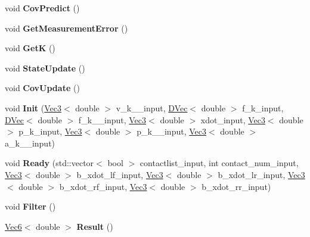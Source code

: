 \begin{DoxyCompactItemize}
\mbox{\label{classKalmanFilterForVE_aac4cbc05791d48ce4db5c0792543b6ca}} 
void {\bfseries Cov\+Predict} ()
\item 
\mbox{\label{classKalmanFilterForVE_aeba0220a16a77d7242fd46fdac46a12c}} 
void {\bfseries Get\+Measurement\+Error} ()
\item 
\mbox{\label{classKalmanFilterForVE_ab5f0573c67c441e4ab6601bc5b39a847}} 
void {\bfseries GetK} ()
\item 
\mbox{\label{classKalmanFilterForVE_ae0236f9ddaf1b50238629b625c12a710}} 
void {\bfseries State\+Update} ()
\item 
\mbox{\label{classKalmanFilterForVE_a4ac37ed6256c1a50a466dbd7e77001b1}} 
void {\bfseries Cov\+Update} ()
\item 
\mbox{\label{classKalmanFilterForVE_a22c13294c1e43ed52ff9a48ee1398243}} 
void {\bfseries Init} (\hyperlink{cppTypes_8h_a65c27bf97693676535dd0b30ea0ad399}{Vec3}$<$ double $>$ v\+\_\+k\+\_\+\_\+input, \hyperlink{cppTypes_8h_adad69baca3c77d5f991be5d3c063fea7}{D\+Vec}$<$ double $>$ f\+\_\+k\+\_\+input, \hyperlink{cppTypes_8h_adad69baca3c77d5f991be5d3c063fea7}{D\+Vec}$<$ double $>$ f\+\_\+k\+\_\+\_\+input, \hyperlink{cppTypes_8h_a65c27bf97693676535dd0b30ea0ad399}{Vec3}$<$ double $>$ xdot\+\_\+input, \hyperlink{cppTypes_8h_a65c27bf97693676535dd0b30ea0ad399}{Vec3}$<$ double $>$ p\+\_\+k\+\_\+input, \hyperlink{cppTypes_8h_a65c27bf97693676535dd0b30ea0ad399}{Vec3}$<$ double $>$ p\+\_\+k\+\_\+\_\+input, \hyperlink{cppTypes_8h_a65c27bf97693676535dd0b30ea0ad399}{Vec3}$<$ double $>$ a\+\_\+k\+\_\+\_\+input)
\item 
\mbox{\label{classKalmanFilterForVE_ac09058040d34c1dbe0832b377e9181d5}} 
void {\bfseries Ready} (std\+::vector$<$ bool $>$ contactlist\+\_\+input, int contact\+\_\+num\+\_\+input, \hyperlink{cppTypes_8h_a65c27bf97693676535dd0b30ea0ad399}{Vec3}$<$ double $>$ b\+\_\+xdot\+\_\+lf\+\_\+input, \hyperlink{cppTypes_8h_a65c27bf97693676535dd0b30ea0ad399}{Vec3}$<$ double $>$ b\+\_\+xdot\+\_\+lr\+\_\+input, \hyperlink{cppTypes_8h_a65c27bf97693676535dd0b30ea0ad399}{Vec3}$<$ double $>$ b\+\_\+xdot\+\_\+rf\+\_\+input, \hyperlink{cppTypes_8h_a65c27bf97693676535dd0b30ea0ad399}{Vec3}$<$ double $>$ b\+\_\+xdot\+\_\+rr\+\_\+input)
\item 
\mbox{\label{classKalmanFilterForVE_a7c65734f15b3d548cc1dded4955a3dce}} 
void {\bfseries Filter} ()
\item 
\mbox{\label{classKalmanFilterForVE_a0cbaff2c7a4c8b5f8ab62e44c96c3275}} 
\hyperlink{cppTypes_8h_a27bb8a600520708a5928332e4e52a92e}{Vec6}$<$ double $>$ {\bfseries Result} ()
\end{DoxyCompactItemize}
